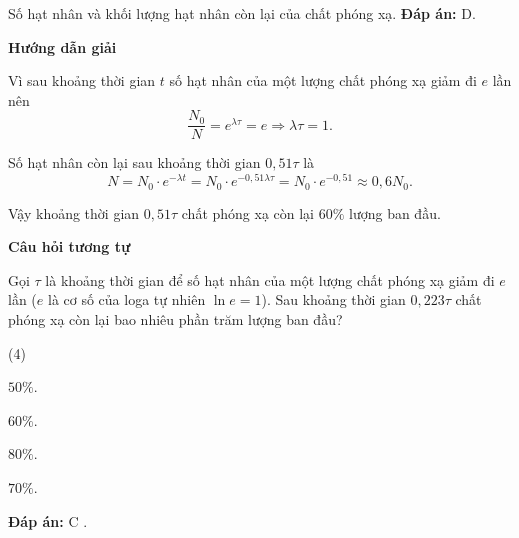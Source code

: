\begin{dang}{Số hạt nhân và khối lượng hạt nhân còn lại của chất phóng xạ.}
{		\textbf{Đáp án:} D.}
	
	{
		\begin{center}
			\textbf{Hướng dẫn giải}
		\end{center}
		
		Vì sau khoảng thời gian $t$ số hạt nhân của một lượng chất phóng xạ giảm đi $e$ lần nên
		\begin{equation*}
			\dfrac{N_0}{N}=e^{\lambda \tau }=e\Rightarrow \lambda \tau  = 1.
		\end{equation*}
		
		Số hạt nhân còn lại sau khoảng thời gian $0,51 \tau$ là
		\begin{equation*}
			N=N_0\cdot e^{-\lambda t}=N_0\cdot e^{-0,51\lambda \tau}=N_0\cdot e^{-0,51}\approx0,6N_0.
		\end{equation*}
		
		Vậy khoảng thời gian $0,51 \tau$ chất phóng xạ còn lại $60\%$ lượng ban đầu.
		
		\begin{center}
			\textbf{Câu hỏi tương tự}
		\end{center}
		
		Gọi $\tau $ là khoảng thời gian để số hạt nhân của một lượng chất phóng xạ giảm đi $e$ lần ($e$ là cơ số của loga tự nhiên $\ln e=1$). Sau khoảng thời gian $0,223 \tau $ chất phóng xạ còn lại bao nhiêu phần trăm lượng ban đầu?
		\begin{mcq}(4)
			\item $50\%$.
			\item $60\%$.
			\item $80\%$.
			\item $70\%$.
		\end{mcq}
		
		\textbf{Đáp án:} C	.
	}
	
\end{dang}

